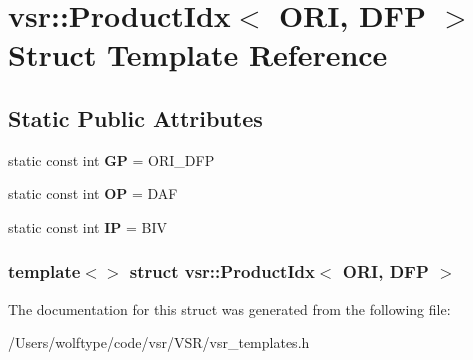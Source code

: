 \hypertarget{structvsr_1_1_product_idx_3_01_o_r_i_00_01_d_f_p_01_4}{\section{vsr\-:\-:Product\-Idx$<$ O\-R\-I, D\-F\-P $>$ Struct Template Reference}
\label{structvsr_1_1_product_idx_3_01_o_r_i_00_01_d_f_p_01_4}
}
\subsection*{Static Public Attributes}
\begin{DoxyCompactItemize}
\item 
\hypertarget{structvsr_1_1_product_idx_3_01_o_r_i_00_01_d_f_p_01_4_a3772d8e1f3a17cbc015f2cb445d9f84e}{static const int {\bfseries G\-P} = O\-R\-I\-\_\-\-D\-F\-P}\label{structvsr_1_1_product_idx_3_01_o_r_i_00_01_d_f_p_01_4_a3772d8e1f3a17cbc015f2cb445d9f84e}

\item 
\hypertarget{structvsr_1_1_product_idx_3_01_o_r_i_00_01_d_f_p_01_4_a7df045f1ac5341ce5d4ce57650f8e32b}{static const int {\bfseries O\-P} = D\-A\-F}\label{structvsr_1_1_product_idx_3_01_o_r_i_00_01_d_f_p_01_4_a7df045f1ac5341ce5d4ce57650f8e32b}

\item 
\hypertarget{structvsr_1_1_product_idx_3_01_o_r_i_00_01_d_f_p_01_4_a6d5ff5f1ec5785e86118870a71a27543}{static const int {\bfseries I\-P} = B\-I\-V}\label{structvsr_1_1_product_idx_3_01_o_r_i_00_01_d_f_p_01_4_a6d5ff5f1ec5785e86118870a71a27543}

\end{DoxyCompactItemize}
\subsubsection*{template$<$$>$ struct vsr\-::\-Product\-Idx$<$ O\-R\-I, D\-F\-P $>$}



The documentation for this struct was generated from the following file\-:\begin{DoxyCompactItemize}
\item 
/\-Users/wolftype/code/vsr/\-V\-S\-R/vsr\-\_\-templates.\-h\end{DoxyCompactItemize}
